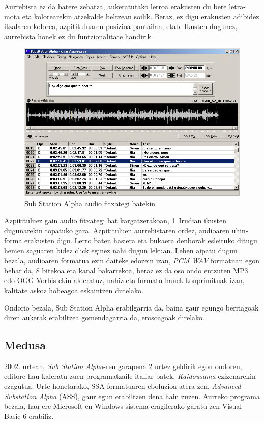Aurrebista ez da batere zehatza, aukeratutako lerroa erakusten du bere letra-mota eta kolorearekin atzekalde beltzean soilik. Beraz, ez digu erakusten adibidez itzalaren kolorea, azpitituluaren posizioa pantailan, etab. Ikusten dugunez, aurrebista honek ez du funtzionalitate handirik.
\begin{figure}[htb]
\begin{center}
\includegraphics[width=\columnwidth, natwidth=789pt, natheight=540pt]{Pictures/Chapter2/ssa-audio.png}
\caption{Sub Station Alpha audio fitxategi batekin}
\label{ssa-audio}
\end{center}
\end{figure}

Azpitituluez gain audio fitxategi bat kargatzerakoan, \ref{ssa-audio}~Irudian ikusten dugunarekin topatuko gara. Azpitituluen aurrebistaren ordez, audioaren uhin-forma erakusten digu. Lerro baten hasiera eta bukaera denborak esleituko ditugu hemen saguaren bidez click eginez nahi dugun lekuan. Lehen aipatu dugun bezala, audioaren formatua ezin daiteke edozein izan, \textit{PCM WAV} formatuan egon behar da, 8 bitekoa eta kanal bakarrekoa, beraz ez da oso ondo entzuten MP3 edo OGG Vorbis-ekin alderatuz, nahiz eta formatu hauek konprimituak izan, kalitate askoz hobeagoa eskaintzen dutelako.

Ondorio bezala, Sub Station Alpha erabilgarria da, baina gaur egungo berriagoak diren aukerak erabiltzea gomendagarria da, erosoagoak direlako.

\subsection{Medusa}
2002. urtean, \textit{Sub Station Alpha}-ren garapena 2 urtez geldirik egon ondoren, editore hau kaleratu zuen programatzaile italiar batek, \textit{Kaidousama} ezizenarekin ezagutua. Urte honetarako, SSA formatuaren eboluzioa atera zen, \textit{Advanced Substation Alpha} (ASS), gaur egun erabiltzen dena hain zuzen. Aurreko programa bezala, hau ere Microsoft-en Windows sistema eragilerako garatu zen Visual Basic 6 erabiliz.

